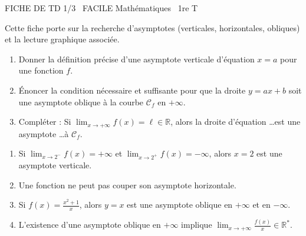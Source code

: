 \documentclass[11pt]{article}
\begin{document}
\begin{tcolorbox}[enhanced,colback=popink,colframe=popink,arc=10pt,boxrule=0pt,left=12pt,right=12pt,top=9pt,bottom=9pt]
{\color{white}\popxbold\small FICHE DE TD 1/3 \textbullet\ FACILE \hfill Mathématiques \textbullet\ 1re T\par}
\end{tcolorbox}
\vspace{4pt}
Cette fiche porte sur la recherche d'asymptotes (verticales, horizontales, obliques) et la lecture graphique associée.

\begin{exercice}
\begin{enumerate}
    \item Donner la définition précise d'une asymptote verticale d'équation $x = a$ pour une fonction $f$.
    \item Énoncer la condition nécessaire et suffisante pour que la droite $y = ax + b$ soit une asymptote oblique à la courbe $\mathcal{C}_f$ en $+\infty$.
    \item Compléter : Si $\lim_{x \to +\infty} f(x) = \ell \in \mathbb{R}$, alors la droite d'équation \ldots est une asymptote \ldots à $\mathcal{C}_f$.
\end{enumerate}
\end{exercice}

\begin{exercice}
\begin{enumerate}
    \item Si $\lim_{x \to 2^-} f(x) = +\infty$ et $\lim_{x \to 2^+} f(x) = -\infty$, alors $x=2$ est une asymptote verticale.
    \item Une fonction ne peut pas couper son asymptote horizontale.
    \item Si $f(x) = \frac{x^2+1}{x}$, alors $y=x$ est une asymptote oblique en $+\infty$ et en $-\infty$.
    \item L'existence d'une asymptote oblique en $+\infty$ implique $\lim_{x \to +\infty} \frac{f(x)}{x} \in \mathbb{R}^*$.
\end{enumerate}
\end{exercice}
\end{document}
